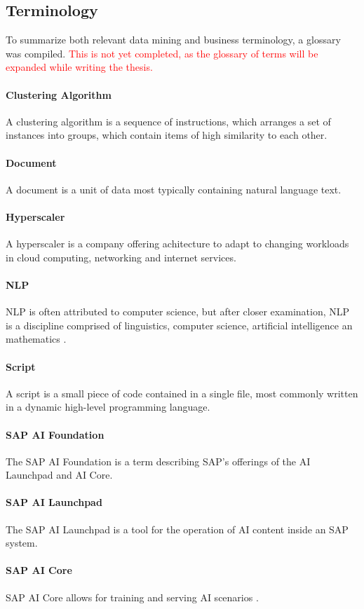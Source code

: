 \subsection{Terminology}
To summarize both relevant data mining and business terminology, a glossary was compiled.
\textcolor{red}{This is not yet completed, as the glossary of terms will be expanded while writing the thesis.}
	\paragraph{Clustering Algorithm} A clustering algorithm is a sequence of instructions, which arranges a set of instances into groups, which contain items of high similarity to each other.
	\paragraph{Document} A document is a unit of data most typically containing natural language text.
	\paragraph{Hyperscaler} A hyperscaler is a company offering achitecture to adapt to changing workloads in cloud computing, networking and internet services.
	\paragraph{\acf{NLP}} \ac{NLP} is often attributed to computer science, but after closer examination, \ac{NLP} is a discipline comprised of linguistics, computer science, artificial intelligence an mathematics \cite{chowdhury2003}.
	\paragraph{Script} A script is  a small piece of code contained in a single file, most commonly written in a dynamic high-level programming language.
	\paragraph{SAP AI Foundation} The SAP AI Foundation is a term describing SAP's offerings of the AI Launchpad and AI Core.
	\paragraph{SAP AI Launchpad} The SAP AI Launchpad is a tool for the operation of AI content inside an SAP system.
	\paragraph{SAP AI Core} SAP AI Core allows for training and serving AI scenarios \cite{schmitzLeonardo}.


